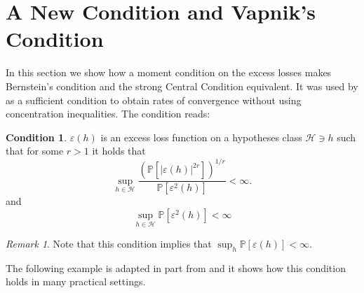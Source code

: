 \documentclass{uvamath}
\newcommand*{\calH}{\mathcal{H}}
\newcommand*{\bbP}{\mathbb{P}}
\theoremstyle{remark}
\newtheorem{remark}[theorem]{Remark}
\theoremstyle{definition}
\theoremstyle{definition}
\theoremstyle{definition}
\theoremstyle{definition}
\theoremstyle{definition}
\newtheorem{condition}{Condition}
\begin{document}
\section{A New Condition and Vapnik's Condition \label{sect:new_vapnik}}

In this section we show how a moment condition on the excess losses
makes Bernstein's condition and the strong Central Condition
equivalent. It was used by \citet[see][Lemma
6.1]{mendelson_learning_2014} as a sufficient condition to obtain
rates of convergence without using concentration inequalities. The
condition reads:
\begin{condition}\label{cond:new}
  $\varepsilon(h)$ is an excess loss function on a hypotheses class
  $\calH\ni h$ such that for some $r > 1$ it holds that
  \begin{equation*}
    \sup_{h\in\calH}\frac{(\bbP[|\varepsilon(h)|^{2r}])^{1/r}}{\bbP[\varepsilon^2(h)]}
    < \infty.
  \end{equation*}
  and
  \begin{equation*}
    \sup_{h\in\calH}  \bbP[\varepsilon^2(h)] <\infty
  \end{equation*}
\end{condition}
\begin{remark}
  Note that this condition implies that
  $\sup_{h}\bbP[\varepsilon(h)]<\infty$.
\end{remark}
The following example is adapted in part from
\citet[p. 208]{vapnik_statistical_1998} and it shows how this
condition holds in many practical settings.
\end{document}
